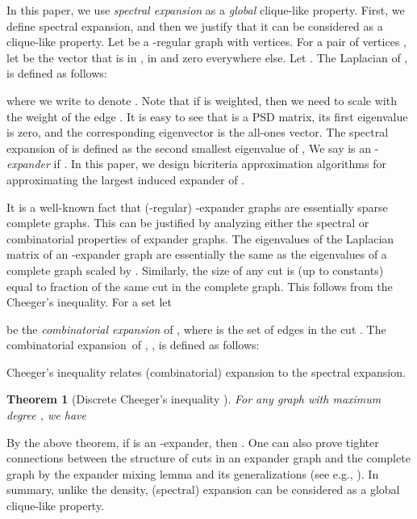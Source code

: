 \documentclass[11pt]{article}
\def\expansion{expansion}
\newtheorem{theorem}{Theorem}[section]
\begin{document}
In this paper, we use \emph{spectral expansion}
as a \emph{global} clique-like property. First, we define spectral expansion, and then we justify that it can be considered as a clique-like property.
Let  be a -regular graph with  vertices.
For a pair of vertices , let  be the vector that is  in ,  in  and zero everywhere else. Let . The Laplacian of ,  is defined as follows:

where we write  to denote . 
Note that if  is weighted, then we need to scale  with the weight of the edge .
It is easy to see that  is a PSD matrix, its first eigenvalue is zero, and the corresponding eigenvector is the all-ones vector.
The spectral expansion of  is defined as the second smallest eigenvalue  of , 
We say  is an -\emph{expander} if .
In this paper,  we design bicriteria approximation algorithms for approximating the largest induced  expander of . 

It is a well-known fact that (-regular)  -expander graphs are essentially sparse complete graphs.
This can be justified    by analyzing either the spectral or combinatorial properties of expander graphs. The eigenvalues of the Laplacian matrix of an -expander graph are essentially the same as the eigenvalues of a complete graph scaled by . 
Similarly, the size of any cut is (up to constants) equal to  fraction of the same cut in the complete graph. This  follows from the Cheeger's inequality.
For a set  let

be the \emph{combinatorial expansion} of , where  is the set of edges in the cut . The combinatorial \expansion~of , , is defined as follows:

 Cheeger's inequality relates (combinatorial) expansion to the spectral expansion.
\begin{theorem}[Discrete Cheeger's inequality \cite{AM85,Alon86}]
\label{thm:cheeger}
For any graph  with maximum degree , we have
	
\end{theorem}
By the above theorem, if  is an -expander, then . 
One can also prove tighter connections between the structure of cuts in an expander graph and the complete graph by  the expander mixing lemma and its generalizations (see e.g., \cite{BL04}).
In summary, unlike the density, (spectral) expansion can be considered as a global clique-like property.
\end{document}
